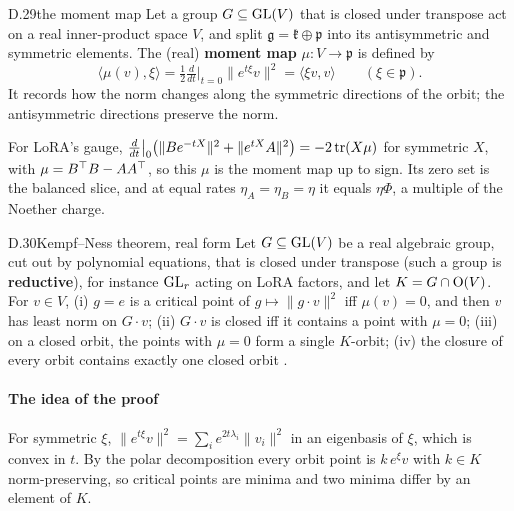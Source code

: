 
\begin{bgentry}{D.29}{the moment map}
Let a group $G\subseteq\mathrm{GL}(V)$ that is closed under transpose act on a real inner-product space $V$, and split
$\mathfrak g=\mathfrak k\oplus\mathfrak p$ into its antisymmetric and symmetric elements. The (real) \textbf{moment map}
$\mu:V\to\mathfrak p$ is defined by
\[\langle\mu(v),\xi\rangle=\tfrac12\tfrac{d}{dt}\Big|_{t=0}\|e^{t\xi}v\|^2=\langle\xi v,v\rangle\qquad(\xi\in\mathfrak p).\]
It records how the norm changes along the symmetric directions of the orbit; the antisymmetric directions preserve the
norm.
\end{bgentry}

For LoRA's gauge, $\tfrac{d}{dt}\big|_{0}\big(\|Be^{-tX}\|^2+\|e^{tX}A\|^2\big)=-2\operatorname{tr}(X\mu)$ for symmetric $X$, with
$\mu=B^{\top} B-AA^{\top}$, so this $\mu$ is the moment map up to sign. Its zero set is the balanced slice, and at equal rates
$\eta_A=\eta_B=\eta$ it equals $\eta\Phi$, a multiple of the Noether charge.


\begin{bgfact}{D.30}{Kempf--Ness theorem, real form}
Let $G\subseteq\mathrm{GL}(V)$ be a real algebraic group, cut out by polynomial equations, that is closed under transpose (such
a group is \textbf{reductive}), for instance $\mathrm{GL}_r$ acting on LoRA factors, and let $K=G\cap\mathrm{O}(V)$. For $v\in V$, (i)
$g=e$ is a critical point of $g\mapsto\|g\cdot v\|^2$ iff $\mu(v)=0$, and then $v$ has least norm on $G\cdot v$; (ii)
$G\cdot v$ is closed iff it contains a point with $\mu=0$; (iii) on a closed orbit, the points with $\mu=0$ form a
single $K$-orbit; (iv) the closure of every orbit contains exactly one closed orbit
\citep{xkempf1979length,xbirkes1971orbits,xrichardson1990minimum}.
\end{bgfact}

\paragraph{The idea of the proof}
For symmetric $\xi$, $\|e^{t\xi}v\|^2=\sum_ie^{2t\lambda_i}\|v_i\|^2$ in an eigenbasis of $\xi$, which is convex in $t$.
By the polar decomposition every orbit point is $k\,e^{\xi}v$ with $k\in K$ norm-preserving, so critical points are
minima and two minima differ by an element of $K$.

